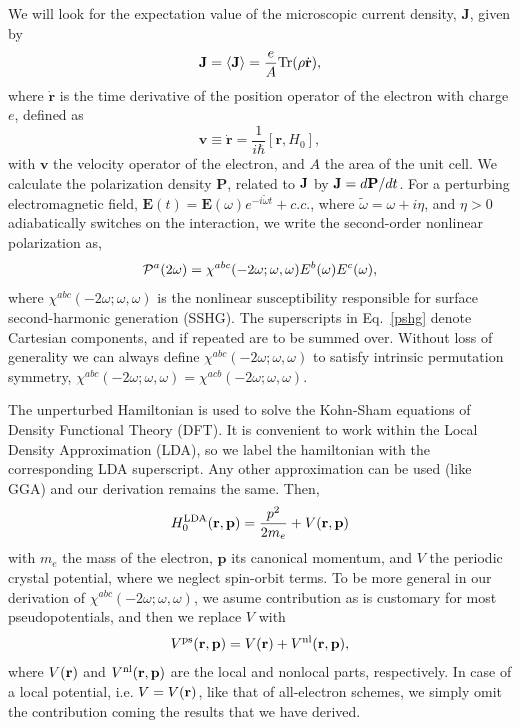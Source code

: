 \documentclass[floatfix,prb,aps,superscriptaddress,showpacs,11pt,preprint,letterpaper]{revtex4}
\begin{document}
We will look for the expectation value of the microscopic current density, 
$\mathbf{J}$, given by 
\begin{equation}
\mathbf{J}=\langle{\mathbf{J}}\rangle=\frac{e}{A}\mbox{Tr}({\rho}\dot{\mathbf{r}})
,
\label{pe}
\end{equation}
where $\dot{\mathbf{r}}$ is the time derivative of the position operator of the
electron with charge $e$, defined as
\begin{equation}
\mathbf{v}\equiv \dot{\mathbf{r}}=\frac{1}{i\hbar }[\mathbf{r},H_0],  
\label{mv}
\end{equation}
with $\mathbf{v}$ the velocity operator of the electron, and $A$ the
area of the unit cell. We calculate the polarization density 
$\mathbf{P}$, related to $\mathbf{J}$ by
$\mathbf{J}=d\mathbf{P}/dt$. For a 
perturbing electromagnetic field, $\mathbf{E}(t)=
\mathbf{E}(\omega )e^{-i\tilde{\omega} t}+c.c.$,
where $\tilde\omega=\omega+i\eta $,
and $\eta >0$ adiabatically switches on the interaction,
we write the second-order nonlinear
polarization as, 
\begin{equation}
{\mathbf{\cal P}}^a(2\omega)=\chi ^{abc}(-2\omega;\omega,\omega)E^{b}(\omega)E^{c}(\omega),  
\label{pshg}
\end{equation}
where $\chi^{abc}(-2\omega ;\omega ,\omega )$ is the nonlinear
susceptibility responsible for surface second-harmonic generation
(SSHG). 
The 
superscripts in Eq.~\eqref{pshg} denote Cartesian components, and if
repeated are to be summed over. Without loss of generality we can always
define $\chi^{abc}(-2\omega;\omega,\omega)$
 to satisfy intrinsic permutation
symmetry, 
$\chi^{abc}(-2\omega ;\omega ,\omega )=\chi ^{acb}(-2\omega ;\omega
,\omega )$.

The unperturbed Hamiltonian 
is used to solve the Kohn-Sham equations\cite{kohnPR65} of Density  
Functional Theory (DFT). It is convenient to work within the Local 
Density Approximation (LDA), so we label the hamiltonian with the corresponding  
LDA superscript. Any other approximation can be used (like GGA) and our 
derivation remains the same. Then,
\begin{equation}\label{h0}
H^{\mathrm{LDA}}_{0}(\mathbf{r},\mathbf{p})
=\frac{p^{2}}{2m_e}+V(\mathbf{r},\mathbf{p})
\end{equation}
with $m_e$ the mass of the electron, $\mathbf{p}$ its canonical momentum, and 
$V$
 the periodic crystal potential, where we neglect spin-orbit terms.
To be more general in our derivation of
$\chi^{abc}(-2\omega;\omega,\omega)$, we asume
contribution as is customary for most
pseudopotentials, and then we replace $V$ with
\begin{align}\label{ps}
V^{\mathrm{ps}}(\mathbf{r},\mathbf{p})=V(\mathbf{r})+V^{\mathrm{nl}}(\mathbf{r},\mathbf{p})
,
\end{align}
where 
$V(\mathbf{r})$ and $V^{\mathrm{nl}}(\mathbf{r},\mathbf{p})$  are the local and nonlocal parts, 
 respectively.
In case of
a local potential, i.e. $V= V(\mathbf{r})$, 
like that of all-electron schemes, 
we simply omit the contribution coming
the results that we have derived.
\end{document}
